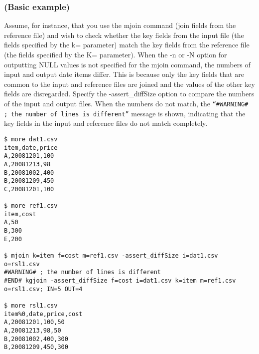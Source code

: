 \subsubsection*{(Basic example) }
Assume, for instance, that you use the mjoin command (join fields from the reference file) and wish to check whether the key fields from the input file (the fields specified by the k= parameter) match the key fields from the reference file (the fields specified by the K= parameter). When the -n or -N option for outputting NULL values is not specified for the mjoin command, the numbers of input and output date items differ. This is because only the key fields that are common to the input and reference files are joined and the values of the other key fields are disregarded. Specify the -assert\_diffSize option to compare the numbers of the input and output files. When the numbers do not match, the \verb|“#WARNING# ; the number of lines is different”| message is shown, indicating that the key fields in the input and reference files do not match completely.

\begin{Verbatim}[baselinestretch=0.7,frame=single]
$ more dat1.csv
item,date,price
A,20081201,100
A,20081213,98
B,20081002,400
B,20081209,450
C,20081201,100

$ more ref1.csv
item,cost
A,50
B,300
E,200

$ mjoin k=item f=cost m=ref1.csv -assert_diffSize i=dat1.csv o=rsl1.csv
#WARNING# ; the number of lines is different
#END# kgjoin -assert_diffSize f=cost i=dat1.csv k=item m=ref1.csv o=rsl1.csv; IN=5 OUT=4

$ more rsl1.csv
item%0,date,price,cost
A,20081201,100,50
A,20081213,98,50
B,20081002,400,300
B,20081209,450,300
\end{Verbatim}
